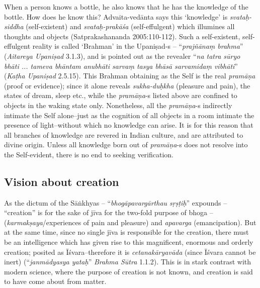 When a person knows a bottle, he also knows that he has the knowledge of the bottle. How does he know this? Advaita-vedānta says this `knowledge' is {\sl svataḥ-siddha} (self-existent) and {\sl svataḥ-prakāśa} (self-effulgent) which illumines all thoughts and objects (Satprakashananda 2005:110-112). Such a self-existent, self-effulgent reality is called `Brahman' in the Upaniṣad-s -- ``{\sl prajñānaṃ brahma}'' ({\sl Aitareya Upaniṣad}  3.1.3), and is pointed out as the revealer ``{\sl na tatra sūryo bhāti ... tameva bhāntam anubhāti sarvaṃ tasya bhāsā sarvamidaṃ vibhāti}'' ({\sl Kaṭha Upaniṣad}  2.5.15). This Brahman obtaining as the Self is the real {\sl pramāṇa} (proof or evidence); since it alone reveals {\sl sukha-duḥkha} (pleasure and pain), the states of dream, sleep etc., while the {\sl pramāṇa}-s listed above are conﬁned to objects in the waking state only. Nonetheless, all the {\sl pramāṇa}-s indirectly intimate the Self alone--just as the cognition of all objects in a room intimate the presence of light--without which no knowledge can arise. It is for this reason that all branches of knowledge are revered in Indian culture, and are attributed to divine origin. Unless all knowledge born out of {\sl pra\-mā\-ṇa}-s does not resolve into the Self-evident, there is no end to seeking veriﬁcation.

\subsection{Vision about creation}\label{art12-sec2.3}

As the dictum of the Sāṅkhyas -- ``{\sl bhogāpavargārthau sṛṣṭiḥ}'' expounds -- ``creation'' is for the sake of jīva for the two-fold purpose of bhoga -- ({\sl karmakṣaya}/experiences of pain and pleasure) and {\sl apavarga} (emancipation). But at the same time, since no single jīva is responsible for the creation, there must be an intelligence which has given rise to this magniﬁcent, enormous and orderly creation; posited as Īśvara--therefore it is {\sl cetanakāryavāda} (since Īśvara cannot be inert) (``{\sl janmādyasya yataḥ}'' {\sl Brahma Sūtra} 1.1.2). This is in stark contrast with modern science, where the purpose of creation is not known, and creation is said to have come about from matter. 

